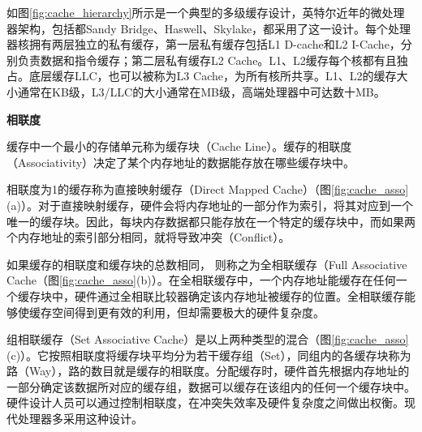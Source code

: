 如图\ref{fig:cache_hierarchy}所示是一个典型的多级缓存设计，英特尔近年的微处理器架构，包括都Sandy Bridge、Haswell、Skylake，都采用了这一设计。每个处理器核拥有两层独立的私有缓存，第一层私有缓存包括L1 D-cache和L2 I-Cache，分别负责数据和指令缓存；第二层私有缓存L2 Cache。L1、L2缓存每个核都有且独占。底层缓存LLC，也可以被称为L3 Cache，为所有核所共享。L1、L2的缓存大小通常在KB级，L3/LLC的大小通常在MB级，高端处理器中可达数十MB。


\textbf{相联度}

缓存中一个最小的存储单元称为缓存块（Cache Line）。缓存的相联度（Associativity）决定了某个内存地址的数据能存放在哪些缓存块中。

相联度为1的缓存称为直接映射缓存（Direct Mapped Cache）（图\ref{fig:cache_asso}(a)）。对于直接映射缓存，硬件会将内存地址的一部分作为索引，将其对应到一个唯一的缓存块。因此，每块内存数据都只能存放在一个特定的缓存块中，而如果两个内存地址的索引部分相同，就将导致冲突（Conflict）。

如果缓存的相联度和缓存块的总数相同， 则称之为全相联缓存（Full Associative Cache（图\ref{fig:cache_asso}(b)）。在全相联缓存中，一个内存地址能缓存在任何一个缓存块中，硬件通过全相联比较器确定该内存地址被缓存的位置。全相联缓存能够使缓存空间得到更有效的利用，但却需要极大的硬件复杂度。

组相联缓存（Set Associative Cache）是以上两种类型的混合（图\ref{fig:cache_asso}(c)）。它按照相联度将缓存块平均分为若干缓存组（Set），同组内的各缓存块称为路（Way），路的数目就是缓存的相联度。分配缓存时，硬件首先根据内存地址的一部分确定该数据所对应的缓存组，数据可以缓存在该组内的任何一个缓存块中。硬件设计人员可以通过控制相联度，在冲突失效率及硬件复杂度之间做出权衡。现代处理器多采用这种设计。

